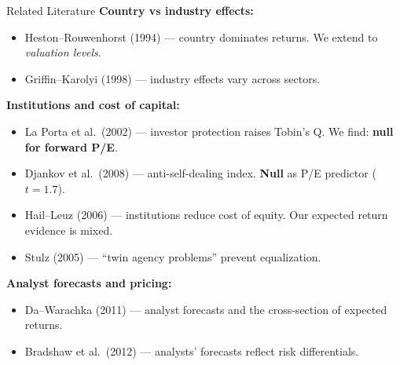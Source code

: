 \documentclass[aspectratio=169, 11pt]{beamer}
\begin{document}
\begin{frame}{Related Literature}
\footnotesize
\vspace{-0.2cm}
\textbf{Country vs industry effects:}
\vspace{-0.1cm}
\begin{itemize}\setlength{\itemsep}{-2pt}\setlength{\parsep}{0pt}\setlength{\topsep}{0pt}
\item Heston--Rouwenhorst (1994) --- country dominates returns. We extend to \emph{valuation levels}.
\item Griffin--Karolyi (1998) --- industry effects vary across sectors.
\end{itemize}
\vspace{-0.1cm}
\textbf{Institutions and cost of capital:}
\vspace{-0.1cm}
\begin{itemize}\setlength{\itemsep}{-2pt}\setlength{\parsep}{0pt}\setlength{\topsep}{0pt}
\item La Porta et al.\ (2002) --- investor protection raises Tobin's Q. We find: \textbf{null for forward P/E}.
\item Djankov et al.\ (2008) --- anti-self-dealing index. \textbf{Null} as P/E predictor ($t = 1.7$).
\item Hail--Leuz (2006) --- institutions reduce cost of equity. Our expected return evidence is mixed.
\item Stulz (2005) --- ``twin agency problems'' prevent equalization.
\end{itemize}
\vspace{-0.1cm}
\textbf{Analyst forecasts and pricing:}
\vspace{-0.1cm}
\begin{itemize}\setlength{\itemsep}{-2pt}\setlength{\parsep}{0pt}\setlength{\topsep}{0pt}
\item Da--Warachka (2011) --- analyst forecasts and the cross-section of expected returns.
\item Bradshaw et al.\ (2012) --- analysts' forecasts reflect risk differentials.
\end{itemize}
\end{frame}
\end{document}

